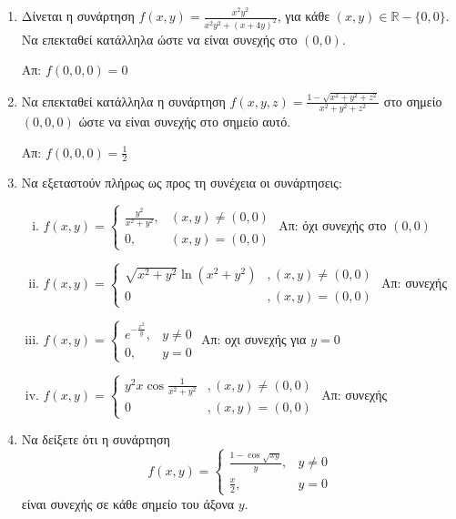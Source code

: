 \begin{enumerate}
  \item Δίνεται η συνάρτηση $f(x,y)=\frac{x^{2}y^{2}}{x^{2}y^{2}+(x+4y)^{2}}$, για κάθε $(x,y)\in \mathbb{R}-\{0,0\}$. Να επεκταθεί κατάλληλα ώστε να είναι συνεχής στο $(0,0)$.

	  \hfill Απ: $ f(0,0,0) = 0 $

  \item Να επεκταθεί κατάλληλα η συνάρτηση $ f(x,y,z) = \frac{ 1 - \sqrt{ x^{2}+y^{2}+z^{2} } }{
	  x^{2}+y^{2}+z^{2}} $ στο σημείο $ (0,0,0) $ ώστε να είναι συνεχής στο σημείο αυτό.

		  \hfill Απ: $ f(0,0,0)= \frac{ 1 }{ 2 } $

  \item Να εξεταστούν πλήρως ως προς τη συνέχεια οι συνάρτησεις:
	  \begin{enumerate}[i)]
          \item $ f(x,y) = \begin{cases} \frac{y^{2}}{x^{2}+y^{2}}, & (x,y) \neq (0,0) \\ 0, & (x,y)
              = (0,0)\end{cases} $
              \hfill Απ: όχι συνεχής στο $ (0,0) $ 
		  \item   \(
			  f(x,y) = \begin{cases}
				  \sqrt{x^{2}+y^{2}}\ln(x^{2}+y^{2}) &, (x,y)\neq (0,0) \\
				  0 &, (x,y)=(0,0)
			  \end{cases}
      \) \hfill Απ: συνεχής
      \item   \(
        f(x,y)=\begin{cases}
          e^{-\frac{x^{2}}{y}}, & y \neq 0 \\
          0, & y=0 
      \end{cases}
        \) \hfill Απ: οχι συνεχής για $y=0$
        \item   \(
          f(x,y)=\begin{cases}
            y^{2}x\cos \frac{1}{x^{2}+y^{2}} &, (x,y)\neq (0,0)\\
            0 &, (x,y)=(0,0)
        \end{cases}
          \) \hfill Απ: συνεχής
  \end{enumerate}

  \item Να δείξετε ότι η συνάρτηση 
      \[
          f(x,y) = \begin{cases} \frac{1- \cos{\sqrt{xy}}}{y}, & y \neq 0 \\ \frac{x}{2}, & y = 0  \end{cases}  
       \] 
       είναι συνεχής σε κάθε σημείο του άξονα $ y $.
\end{enumerate}


